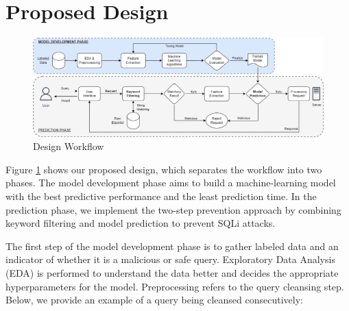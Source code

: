 \section{Proposed Design}
\label{sec:proposed-design}


\begin{figure}
  \centering
  \includegraphics[width=.82\textwidth]{image/SQLI-Final.drawio.png}
  \caption{Design Workflow}
  \label{fig:proposed-workflow}
\end{figure}

\par Figure \ref{fig:proposed-workflow} shows our proposed design, which separates the workflow into two phases. The model development phase aims to build a machine-learning model with the best predictive performance and the least prediction time. In the prediction phase, we implement the two-step prevention approach by combining keyword filtering and model prediction to prevent SQLi attacks.

\par The first step of the model development phase is to gather labeled data and an indicator of whether it is a malicious or safe query. Exploratory Data Analysis (EDA) is performed to understand the data better and decides the appropriate hyperparameters for the model. Preprocessing refers to the query cleansing step. Below, we provide an example of a query being cleansed consecutively:

